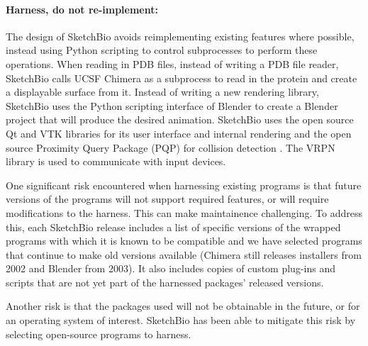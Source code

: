\documentclass[twocolumn]{bmcart}%
\begin{document}
\paragraph*{Harness, do not re-implement:} The design of SketchBio avoids reimplementing existing features where possible, instead using Python scripting to control subprocesses to perform these operations.
When reading in PDB files, instead of writing a PDB file reader, SketchBio calls UCSF Chimera as a subprocess to read in the protein and create a displayable surface from it.
Instead of writing a new rendering library, SketchBio uses the Python scripting interface of Blender to create a Blender project that will produce the desired animation.
SketchBio uses the open source Qt and VTK\cite{VTKbook} libraries for its user interface and internal rendering and the open source Proximity Query Package (PQP) for collision detection \cite{PQP}.
The VRPN library \cite{taylor2001vrpn} is used to communicate with input devices.

One significant risk encountered when harnessing existing programs is that future versions of the programs will not support required features, or will require modifications to the harness.
This can make maintainence challenging.
To address this, each SketchBio release includes a list of specific versions of the wrapped programs with which it is known to be compatible and we have selected programs that continue to make old versions available (Chimera still releases installers from 2002 and Blender from 2003). It also includes copies of custom plug-ins and scripts that are not yet part of the harnessed packages' released versions.

Another risk is that the packages used will not be obtainable in the future, or for an operating system of interest. SketchBio has been able to mitigate this risk by selecting open-source programs to harness.
\end{document}
